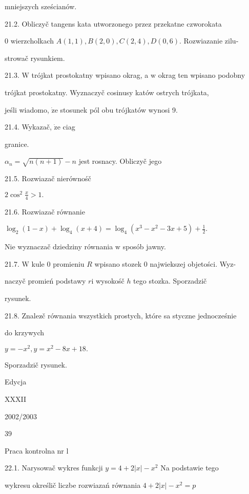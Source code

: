 \documentclass[a4paper,12pt]{article}
\begin{document}
mniejszych sześcianów.

21.2. Obliczyč tangens kata utworzonego przez przekatne czworokata

$0$ wierzcholkach $A(1,1), B(2,0), C(2,4), D(0,6)$. Rozwiazanie zilu-

strowač rysunkiem.

21.3. $\mathrm{W}$ trójkat prostokatny wpisano okrag, a $\mathrm{w}$ okrag ten wpisano podobny

trójkat prostokatny. Wyznaczyč cosinusy katów ostrych trójkata,

jeśli wiadomo, $\dot{\mathrm{z}}\mathrm{e}$ stosunek pól obu trójkatów wynosi 9.

21.4. Wykazač, $\dot{\mathrm{z}}\mathrm{e}$ ciag

granice.

$\alpha_{n}=\sqrt{n(n+1)}-n$ jest rosnacy. Obliczyč jego

21.5. Rozwiazač nierównośč

$2\displaystyle \cos^{2}\frac{x}{4}>1.$

21.6. Rozwiazač równanie

$\displaystyle \log_{2}(1-x)+\log_{4}(x+4)=\log_{4}(x^{3}-x^{2}-3x+5)+\frac{1}{2}.$

Nie wyznaczač dziedziny równania $\mathrm{w}$ sposób jawny.

21.7. $\mathrm{W}$ kule $0$ promieniu $R$ wpisano stozek $0$ najwiekszej objetości. Wyz-

naczyč promień podstawy $r \mathrm{i}$ wysokośč $h$ tego stozka. Sporzadzič

rysunek.

21.8. Znalez$\acute{}$č równania wszystkich prostych, które sa styczne jednocześnie

do krzywych

$y=-x^{2},y=x^{2}-8x+18.$

Sporzadzič rysunek.





Edycja

XXXII

2002/2003





39

Praca kontrolna nr l

22.1. Narysowač wykres funkcji $y = 4+2|x| -x^{2}$ Na podstawie tego

wykresu określič liczbe rozwiazań równania $4 + 2|x| - x^{2} = p$
\end{document}

